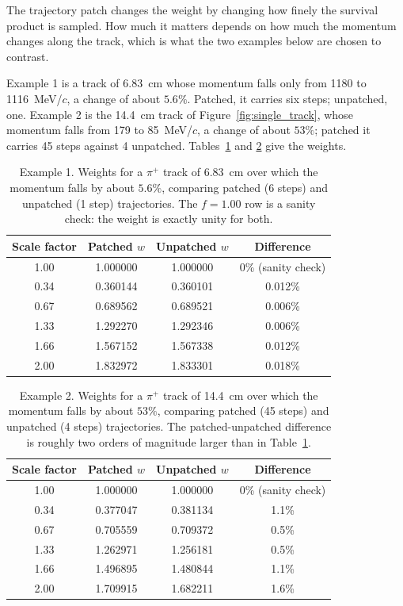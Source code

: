 \documentclass[%
article,
nofootinbib
]{revtex4-2}
\begin{document}
The trajectory patch changes the weight by changing how finely the survival
product is sampled. How much it matters depends on how much the momentum changes
along the track, which is what the two examples below are chosen to contrast.

Example 1 is a track of 6.83~cm whose momentum falls only from 1180 to
1116~MeV/$c$, a change of about $5.6\%$. Patched, it carries six steps; unpatched,
one. Example 2 is the 14.4~cm track of Figure~\ref{fig:single_track}, whose
momentum falls from 179 to 85~MeV/$c$, a change of about $53\%$; patched it
carries 45 steps against 4 unpatched. Tables~\ref{tab:example1} and
\ref{tab:example2} give the weights.

\begin{table}[H]
\centering
\caption{Example 1. Weights for a $\pi^{+}$ track of 6.83~cm over which
the momentum falls by about $5.6\%$, comparing patched (6 steps) and unpatched
(1 step) trajectories. The $f = 1.00$ row is a sanity check: the weight is
exactly unity for both.}
\label{tab:example1}
\begin{tabular}{cccc}
\hline\hline
Scale factor & Patched $w$ & Unpatched $w$ & Difference \\
\hline
1.00 & 1.000000 & 1.000000 & 0\% (sanity check) \\
0.34 & 0.360144 & 0.360101 & 0.012\% \\
0.67 & 0.689562 & 0.689521 & 0.006\% \\
1.33 & 1.292270 & 1.292346 & 0.006\% \\
1.66 & 1.567152 & 1.567338 & 0.012\% \\
2.00 & 1.832972 & 1.833301 & 0.018\% \\
\hline\hline
\end{tabular}
\end{table}

\begin{table}[H]
\centering
\caption{Example 2. Weights for a $\pi^{+}$ track of 14.4~cm over which
the momentum falls by about $53\%$, comparing patched (45 steps) and unpatched
(4 steps) trajectories. The patched-unpatched difference is roughly two orders
of magnitude larger than in Table~\ref{tab:example1}.}
\label{tab:example2}
\begin{tabular}{cccc}
\hline\hline
Scale factor & Patched $w$ & Unpatched $w$ & Difference \\
\hline
1.00 & 1.000000 & 1.000000 & 0\% (sanity check) \\
0.34 & 0.377047 & 0.381134 & 1.1\% \\
0.67 & 0.705559 & 0.709372 & 0.5\% \\
1.33 & 1.262971 & 1.256181 & 0.5\% \\
1.66 & 1.496895 & 1.480844 & 1.1\% \\
2.00 & 1.709915 & 1.682211 & 1.6\% \\
\hline\hline
\end{tabular}
\end{table}
\end{document}
